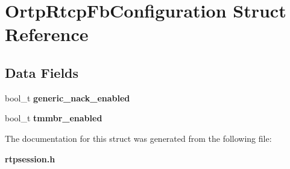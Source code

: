 \section{Ortp\+Rtcp\+Fb\+Configuration Struct Reference}
\label{structOrtpRtcpFbConfiguration}
\subsection*{Data Fields}
\begin{DoxyCompactItemize}
\item 
\mbox{\label{structOrtpRtcpFbConfiguration_a10832722c62df80cb714f752e0bad51e}} 
bool\+\_\+t {\bfseries generic\+\_\+nack\+\_\+enabled}
\item 
\mbox{\label{structOrtpRtcpFbConfiguration_a78f9d131858bd4337339abcb21d517bf}} 
bool\+\_\+t {\bfseries tmmbr\+\_\+enabled}
\end{DoxyCompactItemize}


The documentation for this struct was generated from the following file\+:\begin{DoxyCompactItemize}
\item 
\textbf{ rtpsession.\+h}\end{DoxyCompactItemize}
